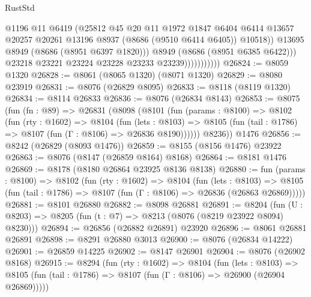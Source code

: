 \begin{lexlean}{RustStd}
\begin{coremodule}
                                @1196
                                @11
                                @6419
                                (@25812
                                  @45
                                  @20
                                  @11
                                  @1972
                                  @1847
                                  @6404
                                  @6414
                                  @13657
                                  @20257
                                  @20261
                                  @13196
                                  @8937
                                  (@8686 (@9510 @6414 @6405))
                                  @10518))
                              @13695
                              @8949
                              (@8686 (@8951 @6397 @1820)))
                            @8949
                            (@8686 (@8951 @6385 @6422)))
                          @23218
                          @23221
                          @23224
                          @23228
                          @23233
                          @23239)))))))))))
@26824 := @8059 @1320
@26828 := @8061 (@8065 @1320) (@8071 @1320)
@26829 := @8080 @23919
@26831 := @8076 (@26829 @8095)
@26833 := @8118 (@8119 @1320)
@26834 := @8114 @26833
@26836 := @8076 (@26834 @8143)
@26853 := @8075
    (fun (fn : @89) =>
    @26831
      (@8098
        (@8101
          (fun (params : @8100) =>
          @8102
            (fun (rty : @1602) =>
            @8104
              (fun (lets : @8103) =>
              @8105 (fun (tail : @1786) => @8107 (fun (Γ : @8106) => @26836 @8190))))))
        @8236))
    @1476
@26856 := @8242 (@26829 (@8093 @1476))
@26859 := @8155 (@8156 @1476) @23922
@26863 := @8076 (@8147 (@26859 @8164) @8168)
@26864 := @8181 @1476
@26869 := @8178 (@8180 @26864 @23925 @8136 @8138)
@26880 := fun (params : @8100) =>
  @8102
    (fun (rty : @1602) =>
    @8104
      (fun (lets : @8103) =>
      @8105 (fun (tail : @1786) => @8107 (fun (Γ : @8106) => @26836 (@26863 @26869)))))
@26881 := @8101 @26880
@26882 := @8098 @26881
@26891 := @8204
    (fun (U : @8203) => @8205 (fun (t : @7) => @8213 (@8076 (@8219 @23922 @8094) @8230)))
@26894 := @26856 (@26882 @26891) @23920
@26896 := @8061 @26881 @26891
@26898 := @8291 @26880 @3013
@26900 := @8076 (@26834 @14222)
@26901 := @26859 @14225
@26902 := @8147 @26901
@26904 := @8076 (@26902 @8168)
@26915 := @8294
    (fun (rty : @1602) =>
    @8104
      (fun (lets : @8103) =>
      @8105 (fun (tail : @1786) => @8107 (fun (Γ : @8106) => @26900 (@26904 @26869)))))

\end{coremodule}
\end{lexlean}
